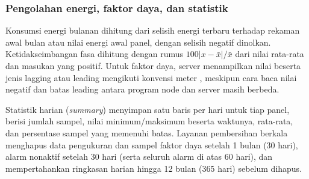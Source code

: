 



\subsubsection{Pengolahan energi, faktor daya, dan statistik}

Konsumsi energi bulanan dihitung dari selisih energi terbaru terhadap rekaman awal bulan atau nilai energi awal panel, dengan selisih negatif dinolkan. Ketidakseimbangan fasa dihitung dengan rumus $100|x-\bar{x}|/\bar{x}$ dari nilai rata-rata dan masukan yang positif. Untuk faktor daya, server menampilkan nilai beserta jenis lagging atau leading mengikuti konvensi meter \citep{schneiderpm2100}, meskipun cara baca nilai negatif dan batas leading antara program node dan server masih berbeda.

Statistik harian (\textit{summary}) menyimpan satu baris per hari untuk tiap panel, berisi jumlah sampel, nilai minimum/maksimum beserta waktunya, rata-rata, dan persentase sampel yang memenuhi batas. Layanan pembersihan berkala menghapus data pengukuran dan sampel faktor daya setelah 1 bulan (30 hari), alarm nonaktif setelah 30 hari (serta seluruh alarm di atas 60 hari), dan mempertahankan ringkasan harian hingga 12 bulan (365 hari) sebelum dihapus.

